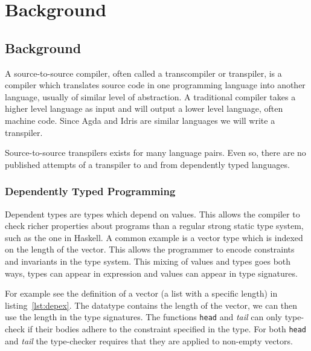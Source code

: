 \chapter{Background}


\section{Background}

A source-to-source compiler, often called a transcompiler or transpiler, is
a compiler which translates source code in one programming language into
another language, usually of similar level of abstraction. A traditional
compiler takes a higher level language as input and will output a lower level
language, often machine code.  Since Agda and Idris are similar languages we will write a transpiler.

Source-to-source transpilers exists for many language pairs. Even so, there are
no published attempts of a transpiler to and from dependently
typed languages.




\subsection{Dependently Typed Programming}

Dependent types are types which depend on values.
This allows the compiler to check richer properties about programs than
a regular strong static type system, such as the one in Haskell.
A common example is a vector type which is indexed on the length of
the vector. This allows the programmer to encode constraints and invariants in
the type system.
This mixing of values and types goes both ways, types can appear in expression
and values can appear in type signatures.


For example see the definition of a vector (a list with a specific length) in
listing~\ref{lst:depex}. The datatype contains the length of the vector, we can
then use the length in the type signatures.
The functions \texttt{head} and \textit{tail} can only type-check if their
bodies adhere to the constraint specified in the type.
For both \texttt{head} and \textit{tail} the type-checker requires that they
are applied to non-empty vectors.


